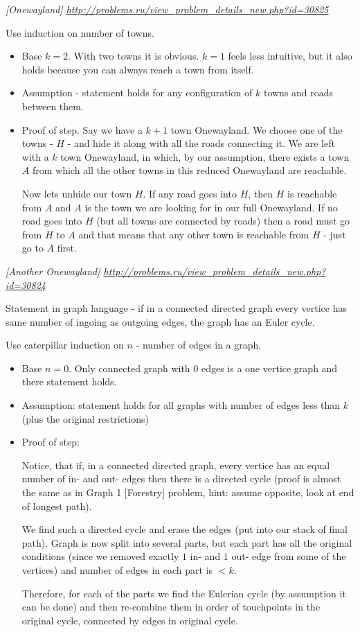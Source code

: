 \begin{problem}
\textit{[Onewayland] \url{http://problems.ru/view_problem_details_new.php?id=30825}}

Use induction on number of towns. 
\begin{itemize}
\item Base $k=2$. With two towns it is obvious. $k=1$ feels less intuitive, but it also holds because you can always reach a town from itself.
\item Assumption - statement holds for any configuration of $k$ towns and roads between them.
\item Proof of step. Say we have a $k+1$ town Onewayland. We choose one of the towns - $H$ - and hide it along with all the roads connecting it. We are left with a $k$ town Onewayland, in which, by our assumption, there exists a town $A$ from which all the other towns in this reduced Onewayland are reachable.

Now lets unhide our town $H$. If any road goes into $H$, then $H$ is reachable from $A$ and $A$ is the town we are looking for in our full Onewayland. If no road goes into $H$ (but all towns are connected by roads) then a road must go from $H$ to $A$ and that means that any other town is reachable from $H$ - just go to $A$ first.
\end{itemize}
\end{problem}
%



\begin{problem}
\textit{[Another Onewayland] \url{http://problems.ru/view_problem_details_new.php?id=30824}}

Statement in graph language - if in a connected directed graph every vertice has same number of ingoing as outgoing edges, the graph has an Euler cycle.

Use caterpillar induction on $n$ - number of edges in a graph. 
\begin{itemize}
\item Base $n=0$. Only connected graph with $0$ edges is a one vertice graph and there statement holds.
\item Assumption: statement holds for all graphs with number of edges less than $k$ (plus the original restrictions)
\item Proof of step: 

Notice, that if, in a connected directed graph, every vertice has an equal number of in- and out- edges then there is a directed cycle (proof is almost the same as in Graph 1 [Forestry] problem, hint: assume opposite, look at end of longest path).

We find such a directed cycle and erase the edges (put into our stack of final path). Graph is now split into several parts, but each part has all the original conditions (since we removed exactly $1$ in- and $1$ out- edge from some of the vertices) and number of edges in each part is $<k$. 

Therefore, for each of the parts we find the Eulerian cycle (by assumption it can be done) and then re-combine them in order of touchpoints in the original cycle, connected by edges in original cycle.
\end{itemize}
\end{problem}
%

